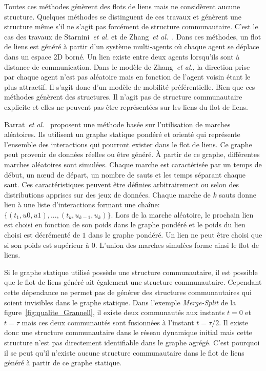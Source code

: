 Toutes ces méthodes génèrent des flots de liens mais ne considèrent aucune structure.
Quelques méthodes se distinguent de ces travaux et génèrent une structure même s'il ne s'agit pas forcément de structure communautaire.
C'est le cas des travaux de Starnini~\emph{et al.}\cite{Starnini2013} et de Zhang~\emph{et al.}~\cite{Zhang2015a}.
Dans ces méthodes, un flot de liens est généré à partir d'un système multi-agents où chaque agent se déplace dans un espace 2D borné.
Un lien existe entre deux agents lorsqu'ils sont à distance de communication.
Dans le modèle de Zhang~\emph{et al.}, la direction prise par chaque agent n'est pas aléatoire mais en fonction de l'agent voisin étant le plus attractif.
Il s'agit donc d'un modèle de mobilité préférentielle.
Bien que ces méthodes génèrent des structures.
Il n'agit pas de structure communautaire explicite et elles ne peuvent pas être représentées sur les liens du flot de liens.



Barrat~\emph{et al.}~\cite{Barrat2013a} proposent une méthode basée sur l'utilisation de marches aléatoires.
Ils utilisent un graphe statique pondéré et orienté qui représente l'ensemble des interactions qui pourront exister dans le flot de liens.
Ce graphe peut provenir de données réelles ou être généré.
\`A partir de ce graphe, différentes marches aléatoires sont simulées.
Chaque marche est caractérisée par un temps de début, un n\oe{}ud de départ, un nombre de sauts et les temps séparant chaque saut.
Ces caractéristiques peuvent être définies arbitrairement ou selon des distributions apprises sur des jeux de données.
Chaque marche de $k$ sauts donne lieu à une liste d'interactions formant une chaîne: $\{(t_1,u0,u1), ..., (t_k,u_{k-1}, u_k)\}$.
Lors de la marche aléatoire, le prochain lien est choisi en fonction de son poids dans le graphe pondéré et le poids du lien choisi est décrémenté de $1$ dans le graphe pondéré.
Un lien ne peut être choisi que si son poids est supérieur à $0$.
L'union des marches simulées forme ainsi le flot de liens.


Si le graphe statique utilisé possède une structure communautaire, il est possible que le flot de liens généré ait également une structure communautaire.
Cependant cette dépendance ne permet pas de générer des structures communautaires qui soient invisibles dans le graphe statique.
Dans l'exemple \emph{Merge-Split} de la figure~\ref{fig:qualite_Grannell}, il existe deux communautés aux instants $t=0$ et $t=\tau$ mais ces deux communautés sont fusionnées à l'instant $t=\tau/2$.
Il existe donc une structure communautaire dans le réseau dynamique initial mais cette structure n'est pas directement identifiable dans le graphe agrégé.
C'est pourquoi il se peut qu'il n'existe aucune structure communautaire dans le flot de liens généré à partir de ce graphe statique.


